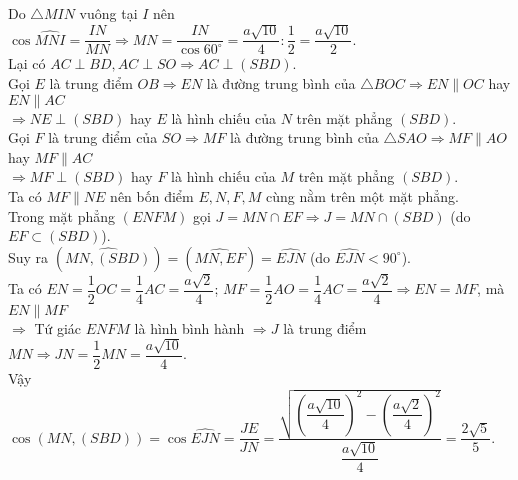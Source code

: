 \begin{ex}
{        Do $\triangle MIN$ vuông tại $I$ nên $\cos\widehat{MNI}=\dfrac{IN}{MN}\Rightarrow MN=\dfrac{IN}{\cos 60^{\circ}}=\dfrac{a\sqrt{10}}{4}\colon\dfrac{1}{2}=\dfrac{a\sqrt{10}}{2}$.\\
        Lại có $AC\perp BD,AC\perp SO\Rightarrow AC\perp(SBD)$.\\
        Gọi $E$ là trung điểm $OB\Rightarrow EN$ là đường trung bình của $\triangle BOC\Rightarrow EN\parallel OC$ hay $EN\parallel AC$ \\
        $\Rightarrow NE\perp(SBD) $ hay $E$ là hình chiếu của $N$ trên mặt phẳng $(SBD)$.\\
        Gọi $F$ là trung điểm của $SO\Rightarrow MF$ là đường trung bình của $\triangle SAO\Rightarrow MF\parallel AO$ hay $MF\parallel AC$ \\
        $\Rightarrow MF\perp(SBD) $ hay $F$ là hình chiếu của $M$ trên mặt phẳng $(SBD)$.\\
        Ta có $MF\parallel NE$ nên bốn điểm $E,N,F,M$ cùng nằm trên một mặt phẳng.\\
        Trong mặt phẳng $(ENFM)$ gọi $J=MN\cap EF\Rightarrow J=MN\cap(SBD)$ (do $EF\subset(SBD)$).\\
        Suy ra $\left(\widehat{MN,(SBD)}\right)=\left(\widehat{MN,EF}\right)=\widehat{EJN}$ (do $\widehat{EJN}<90^{\circ}$).\\
        Ta có $EN=\dfrac{1}{2}OC=\dfrac{1}{4}AC=\dfrac{a\sqrt{2}}{4}$; $MF=\dfrac{1}{2}AO=\dfrac{1}{4}AC=\dfrac{a\sqrt{2}}{4}\Rightarrow EN=MF$, mà $EN\parallel MF$ \\
        $\Rightarrow $ Tứ giác $ENFM$ là hình bình hành $\Rightarrow J$ là trung điểm $MN\Rightarrow JN=\dfrac{1}{2}MN=\dfrac{a\sqrt{10}}{4}$.\\
        Vậy $\cos\left(MN,(SBD)\right)=\cos\widehat{EJN}=\dfrac{JE}{JN}=\dfrac{\sqrt{\left(\dfrac{a\sqrt{10}}{4}\right)^2-\left(\dfrac{a\sqrt{2}}{4}\right)^2}}{\dfrac{a\sqrt{10}}{4}} =\dfrac{2\sqrt{5}}{5}$.
    }
\end{ex}

